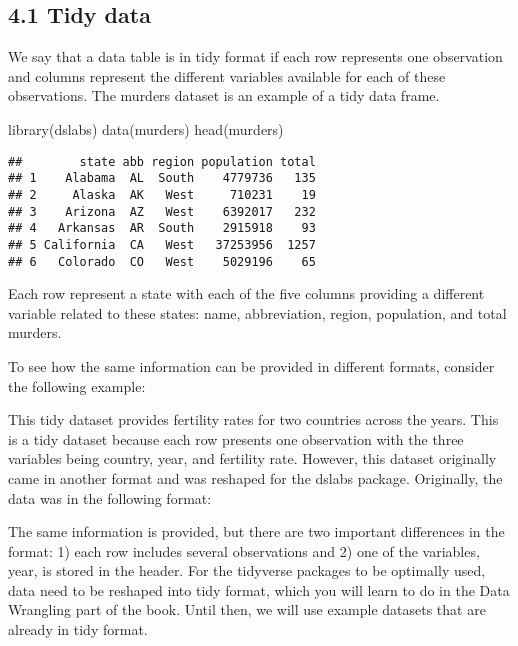\documentclass[
]{article}
\newenvironment{Shaded}{\begin{snugshade}}{\end{snugshade}}
\newcommand{\FunctionTok}[1]{\textcolor[rgb]{0.00,0.00,0.00}{#1}}
\newcommand{\NormalTok}[1]{#1}
\begin{document}
\hypertarget{tidy-data}{%
\subsection{4.1 Tidy data}\label{tidy-data}}

We say that a data table is in tidy format if each row represents one
observation and columns represent the different variables available for
each of these observations. The murders dataset is an example of a tidy
data frame.

\begin{Shaded}
\begin{Highlighting}[]
\FunctionTok{library}\NormalTok{(dslabs)}
\FunctionTok{data}\NormalTok{(murders)}
\FunctionTok{head}\NormalTok{(murders)}
\end{Highlighting}
\end{Shaded}

\begin{verbatim}
##        state abb region population total
## 1    Alabama  AL  South    4779736   135
## 2     Alaska  AK   West     710231    19
## 3    Arizona  AZ   West    6392017   232
## 4   Arkansas  AR  South    2915918    93
## 5 California  CA   West   37253956  1257
## 6   Colorado  CO   West    5029196    65
\end{verbatim}

Each row represent a state with each of the five columns providing a
different variable related to these states: name, abbreviation, region,
population, and total murders.

To see how the same information can be provided in different formats,
consider the following example:

This tidy dataset provides fertility rates for two countries across the
years. This is a tidy dataset because each row presents one observation
with the three variables being country, year, and fertility rate.
However, this dataset originally came in another format and was reshaped
for the dslabs package. Originally, the data was in the following
format:

The same information is provided, but there are two important
differences in the format: 1) each row includes several observations and
2) one of the variables, year, is stored in the header. For the
tidyverse packages to be optimally used, data need to be reshaped into
tidy format, which you will learn to do in the Data Wrangling part of
the book. Until then, we will use example datasets that are already in
tidy format.
\end{document}
